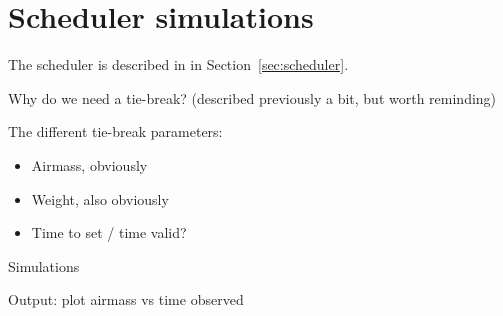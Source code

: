 \section{Scheduler simulations}
\label{sec:scheduler_sims}
\begin{colsection}


\begin{colsection}

The scheduler is described in in Section~\ref{sec:scheduler}.

Why do we need a tie-break? (described previously a bit, but worth reminding)

The different tie-break parameters:
\begin{itemize}
    \item Airmass, obviously
    \item Weight, also obviously
    \item Time to set / time valid?
\end{itemize}

Simulations

Output: plot airmass vs time observed


\end{colsection}

\end{colsection}


\newpage
